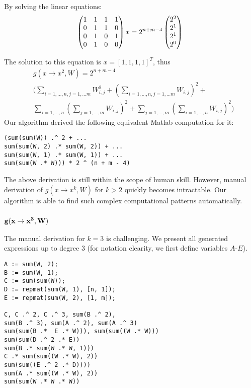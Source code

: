  By solving the linear equations:
 \begin{equation}
 \begin{pmatrix} 
  1 & 1 & 1 & 1 \\ 
  0 & 1 & 1 & 0 \\ 
  0 & 1 & 0 & 1 \\ 
  0 & 1 & 0 & 0 \\     
\end{pmatrix}x = 2^{n + m - 4}\begin{pmatrix} 
  2^{2}\\ 
  2^{1}\\ 
  2^{1}\\ 
  2^{0}\\     
\end{pmatrix} \\
 \end{equation}

The solution to this equation is $x=[1, 1, 1, 1]^T$, thus 
\begin{align*}
	&g(x \rightarrow x^2, W) = 2^{n + m - 4} \\ 
 &\Big(\sum_{i = 1, \dots, n, j = 1, \dots m} W_{i, j}^2 + (\sum_{i = 1, \dots, n, j = 1, \dots m} W_{i, j})^2 + \\
 &\sum_{i = 1, \dots, n}(\sum_{j = 1, \dots, m} W_{i, j})^2 + \sum_{j = 1, \dots, m}(\sum_{i = 1, \dots, n} W_{i, j})^2 \Big)
\end{align*}
Our algorithm derived the following equivalent Matlab computation for it:
\begin{lstlisting}
(sum(sum(W)) .^ 2 + ...
sum(sum(W, 2) .* sum(W, 2)) + ... 
sum(sum(W, 1) .* sum(W, 1)) + ... 
sum(sum(W .* W))) * 2 ^ (n + m - 4)
\end{lstlisting}
The above derivation is still within the scope of human skill. However, manual derivation
of $g(x \rightarrow x^k, W)$ for $k > 2$ quickly becomes intractable. Our algorithm
is able to find such complex computational patterns automatically. 

\subsubsection{{$\bf g(x \rightarrow x^3, W)$}}
The manual derivation for $k = 3$ is challenging. We present all generated expressions up to degree 
$3$ (for notation clearity, we first define variables $A$-$E$).
\vspace{-0.4cm}
\begin{lstlisting}
A := sum(W, 2);
B := sum(W, 1);
C := sum(sum(W));
D := repmat(sum(W, 1), [n, 1]);
E := repmat(sum(W, 2), [1, m]);

C, C .^ 2, C .^ 3, sum(B .^ 2), 
sum(B .^ 3), sum(A .^ 2), sum(A .^ 3)
sum(sum(B .*  E .* W))), sum(sum((W .* W)))
sum(sum(D .^ 2 .* E))
sum(B .* sum(W .* W, 1)))
C .* sum(sum((W .* W), 2))
sum(sum((E .^ 2 .* D)))) 
sum(A .* sum((W .* W), 2))
sum(sum(W .* W .* W))
\end{lstlisting}

